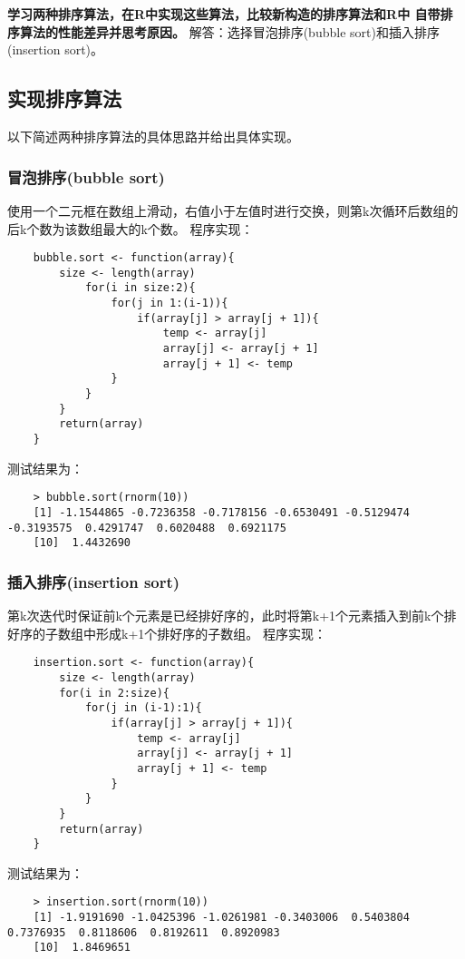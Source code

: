 \documentclass[UTF8]{article}
\begin{document}
	\section{}
	\textbf{学习两种排序算法，在R中实现这些算法，比较新构造的排序算法和R中
		自带排序算法的性能差异并思考原因。}
	\bigbreak
	解答：选择冒泡排序(bubble sort)和插入排序(insertion sort)。
	
	\subsection{实现排序算法}
	以下简述两种排序算法的具体思路并给出具体实现。
	\subsubsection{冒泡排序(bubble sort)}
	使用一个二元框在数组上滑动，右值小于左值时进行交换，则第k次循环后数组的后k个数为该数组最大的k个数。
	程序实现：
	\begin{lstlisting}
	bubble.sort <- function(array){
		size <- length(array)
			for(i in size:2){
				for(j in 1:(i-1)){
					if(array[j] > array[j + 1]){
						temp <- array[j]
						array[j] <- array[j + 1]
						array[j + 1] <- temp
				}
			}
		}
		return(array)
	}
	\end{lstlisting}
	测试结果为：
	\begin{lstlisting}
	> bubble.sort(rnorm(10))
	[1] -1.1544865 -0.7236358 -0.7178156 -0.6530491 -0.5129474 -0.3193575  0.4291747  0.6020488  0.6921175
	[10]  1.4432690
	\end{lstlisting}

	\subsubsection{插入排序(insertion sort)}
	第k次迭代时保证前k个元素是已经排好序的，此时将第k+1个元素插入到前k个排好序的子数组中形成k+1个排好序的子数组。
	程序实现：
	\begin{lstlisting}
	insertion.sort <- function(array){
		size <- length(array)
		for(i in 2:size){
			for(j in (i-1):1){
				if(array[j] > array[j + 1]){
					temp <- array[j]
					array[j] <- array[j + 1]
					array[j + 1] <- temp
				}
			}
		}
		return(array)
	}
	\end{lstlisting}
	测试结果为：
	\begin{lstlisting}
	> insertion.sort(rnorm(10))
	[1] -1.9191690 -1.0425396 -1.0261981 -0.3403006  0.5403804  0.7376935  0.8118606  0.8192611  0.8920983
	[10]  1.8469651
	\end{lstlisting}
\end{document}
